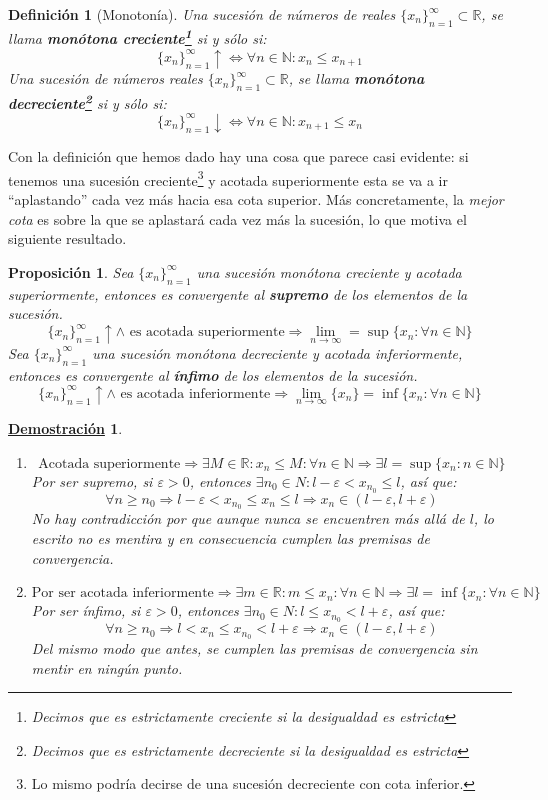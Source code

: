 \documentclass[10pt,a4paper,openright]{book}
\theoremstyle{break}
\newtheorem{defi}{Definición}[chapter]
\newtheorem{prop}{Proposición}[chapter]
\newtheorem*{demo}{\underline{Demostración}}
\begin{document}
\begin{defi}[Monotonía]
Una sucesión de números de reales $\{x_n\}_{n=1}^\infty\subset \mathbb R$, se llama \textbf{monótona creciente\footnote{Decimos que es estrictamente creciente si la desigualdad es estricta}} si y sólo si:
\[
\{x_n\}_{n=1}^\infty \uparrow \Leftrightarrow \forall n\in \mathbb N: x_n\leq x_{n+1}
\]
Una sucesión de números reales $\{x_n\}_{n=1}^\infty\subset \mathbb R$, se llama \textbf{monótona decreciente\footnote{Decimos que es estrictamente decreciente si la desigualdad es estricta}} si y sólo si:
\[
\{x_n\}_{n=1}^\infty \downarrow \Leftrightarrow \forall n\in \mathbb N: x_{n+1}\leq x_n
\]
\end{defi}

Con la definición que hemos dado hay una cosa que parece casi evidente: si tenemos una sucesión creciente\footnote{Lo mismo podría decirse de una sucesión decreciente con cota inferior.} y acotada superiormente esta se va a ir ``aplastando'' cada vez más hacia esa cota superior. Más concretamente, la \textit{mejor cota} es sobre la que se aplastará cada vez más la sucesión, lo que motiva el siguiente resultado.

\begin{prop}
Sea $\{x_n\}_{n=1}^\infty$ una sucesión monótona creciente y acotada superiormente, entonces es convergente al \textbf{supremo} de los elementos de la sucesión.
\[
\{x_n\}_{n=1}^\infty \uparrow \wedge \mbox{ es acotada superiormente}\Rightarrow \lim_{n\rightarrow \infty} = \sup\{x_n: \forall n\in \mathbb N\}
\]
Sea $\{x_n\}_{n=1}^\infty$ una sucesión monótona decreciente y acotada inferiormente, entonces es convergente al \textbf{ínfimo} de los elementos de la sucesión.
\[
\{x_n\}_{n=1}^\infty \uparrow \wedge \mbox{ es acotada inferiormente}\Rightarrow \lim_{n\rightarrow \infty} \{x_n\} = \inf\{x_n: \forall n\in \mathbb N\}
\]
\end{prop}
\begin{demo}
\begin{enumerate}
\item 
$$\mbox{Acotada superiormente}\Rightarrow \exists M\in \mathbb R: x_n\leq M: \forall n\in \mathbb N\Rightarrow \exists l=\sup\{x_n: n\in \mathbb N\}$$
Por ser supremo, si $\varepsilon>0$, entonces $\exists n_0\in N: l-\varepsilon<x_{n_0}\leq l$, así que:
$$\forall n\geq n_0\Rightarrow l-\varepsilon< x_{n_0}\leq x_n\leq l \Rightarrow x_n\in (l-\varepsilon, l+\varepsilon)$$
No hay contradicción por que aunque nunca se encuentren más allá de $l$, lo escrito no es mentira y en consecuencia cumplen las premisas de convergencia.

\item 
$$\mbox{Por ser acotada inferiormente}\Rightarrow \exists m\in \mathbb R: m\leq x_n: \forall n\in \mathbb N\Rightarrow \exists l=\inf\{x_n: \forall n\in \mathbb N\}$$
Por ser ínfimo, si $\varepsilon>0$, entonces $\exists n_0\in N: l\leq x_{n_0}<l+\varepsilon$, así que:
$$\forall n\geq n_0\Rightarrow l< x_n\leq x_{n_0} <l+\varepsilon \Rightarrow x_n\in (l-\varepsilon, l+\varepsilon)$$
Del mismo modo que antes, se cumplen las premisas de convergencia sin mentir en ningún punto.
\end{enumerate}
\end{demo}
\end{document}
